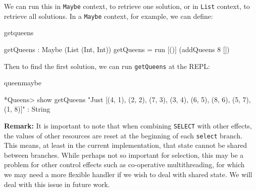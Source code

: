 \noindent
We can run this in \texttt{Maybe} context, to retrieve one solution, or in
\texttt{List} context, to retrieve all solutions. In a
\texttt{Maybe} context, for example, we can define:

\begin{SaveVerbatim}{getqueens}

getQueens : Maybe (List (Int, Int))
getQueens = run [()] (addQueens 8 [])

\end{SaveVerbatim}

\noindent
Then to find the first solution, we can run \texttt{getQueens} at the \Idris{}
REPL:

\begin{SaveVerbatim}{queenmaybe}

*Queens> show getQueens
"Just [(4, 1), (2, 2), (7, 3), (3, 4), 
       (6, 5), (8, 6), (5, 7), (1, 8)]" : String

\end{SaveVerbatim}

\noindent
\textbf{Remark:} It is important to note that when combining \texttt{SELECT}
with other effects, the values of other resources are reset at the beginning
of each \texttt{select} branch. This means, at least in the current implementation,
that state cannot be shared between branches. While perhaps not so important
for selection, this may be a problem for other control effects such as 
co-operative multithreading, for which we may need a more flexible handler if
we wish to deal with shared state. We will deal with this issue in future work.
